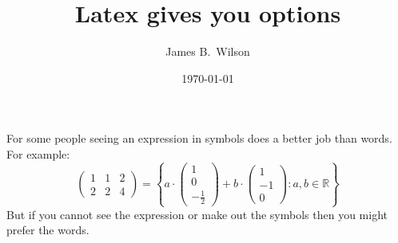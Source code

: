 \documentclass{amsart}
\title{Latex gives you options}
\author{James B.\ Wilson}
\date{\today}
\newcommand{\Null}{}
\begin{document}
\maketitle 
For some people seeing an expression in symbols does a better job than words.  For example:
\begin{equation}
    \Null
    \begin{pmatrix}
        1 & 1 & 2\\ 2 & 2 & 4
    \end{pmatrix}
    = \left\{
        a\cdot
        \begin{pmatrix}
            1 \\ 0 \\ -\frac{1}{2}
        \end{pmatrix}
        +
        b\cdot
        \begin{pmatrix}
            1 \\ -1 \\ 0 
        \end{pmatrix}    
        :
        a,b\in \mathbb{R}
        \right\}        
\end{equation}
But if you cannot see the expression or make out the symbols then you might prefer the words.
\end{document}
